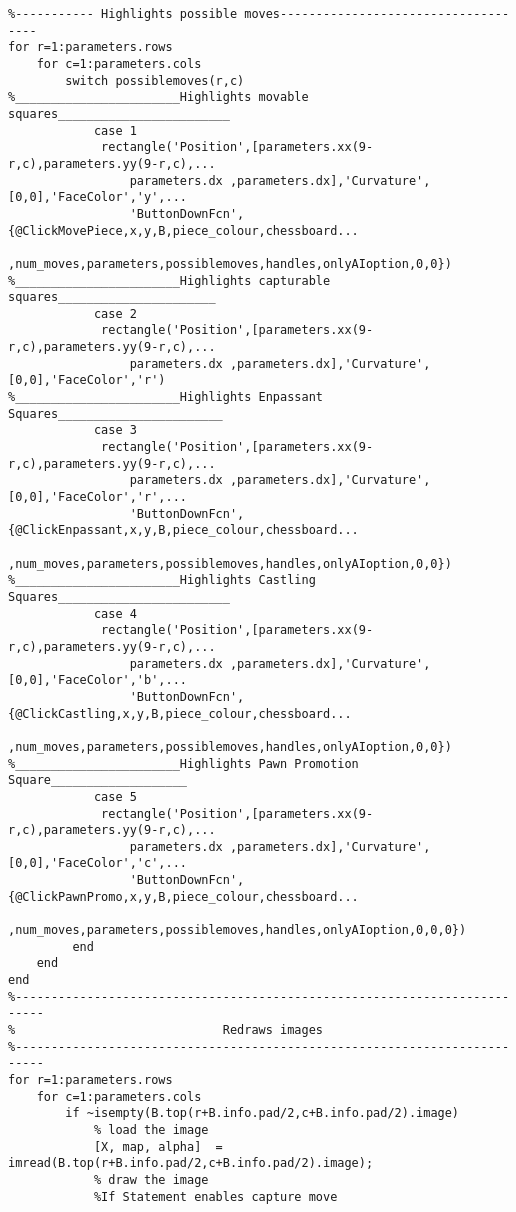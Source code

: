 \documentclass{article}
\begin{document}
\begin{lstlisting}
%----------- Highlights possible moves------------------------------------
for r=1:parameters.rows
    for c=1:parameters.cols
        switch possiblemoves(r,c)
%_______________________Highlights movable squares________________________
            case 1
             rectangle('Position',[parameters.xx(9-r,c),parameters.yy(9-r,c),...
                 parameters.dx ,parameters.dx],'Curvature',[0,0],'FaceColor','y',...
                 'ButtonDownFcn',{@ClickMovePiece,x,y,B,piece_colour,chessboard...
                 ,num_moves,parameters,possiblemoves,handles,onlyAIoption,0,0})
%_______________________Highlights capturable squares______________________
            case 2
             rectangle('Position',[parameters.xx(9-r,c),parameters.yy(9-r,c),...
                 parameters.dx ,parameters.dx],'Curvature',[0,0],'FaceColor','r')
%_______________________Highlights Enpassant Squares_______________________
            case 3
             rectangle('Position',[parameters.xx(9-r,c),parameters.yy(9-r,c),...
                 parameters.dx ,parameters.dx],'Curvature',[0,0],'FaceColor','r',...
                 'ButtonDownFcn',{@ClickEnpassant,x,y,B,piece_colour,chessboard...
                 ,num_moves,parameters,possiblemoves,handles,onlyAIoption,0,0})
%_______________________Highlights Castling Squares________________________
            case 4
             rectangle('Position',[parameters.xx(9-r,c),parameters.yy(9-r,c),...
                 parameters.dx ,parameters.dx],'Curvature',[0,0],'FaceColor','b',...
                 'ButtonDownFcn',{@ClickCastling,x,y,B,piece_colour,chessboard...
                 ,num_moves,parameters,possiblemoves,handles,onlyAIoption,0,0})
%_______________________Highlights Pawn Promotion Square___________________
            case 5
             rectangle('Position',[parameters.xx(9-r,c),parameters.yy(9-r,c),...
                 parameters.dx ,parameters.dx],'Curvature',[0,0],'FaceColor','c',...
                 'ButtonDownFcn',{@ClickPawnPromo,x,y,B,piece_colour,chessboard...
                 ,num_moves,parameters,possiblemoves,handles,onlyAIoption,0,0,0})
         end
    end
end
%--------------------------------------------------------------------------
%                             Redraws images 
%--------------------------------------------------------------------------
for r=1:parameters.rows
    for c=1:parameters.cols
        if ~isempty(B.top(r+B.info.pad/2,c+B.info.pad/2).image)
            % load the image
            [X, map, alpha]  = imread(B.top(r+B.info.pad/2,c+B.info.pad/2).image);
            % draw the image
            %If Statement enables capture move

\end{lstlisting}
\end{document}
